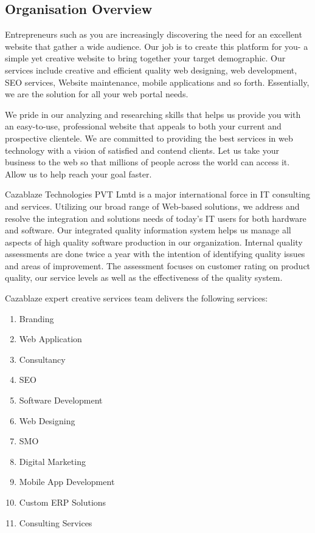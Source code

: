 \documentclass[a4paper,12pt]{article}
\begin{document}
\subsection{Organisation Overview}\vspace{5mm}
             Entrepreneurs such as you are increasingly discovering the need for an excellent website that gather a wide audience. Our job is to create this platform for you- a simple yet creative website to bring together your target demographic. Our services include creative and efficient quality web designing, web development, SEO services, Website maintenance, mobile applications and so forth. Essentially, we are the solution for all your web portal needs.
\newpage
\par  \vspace{2mm} 
            We pride in our analyzing and researching skills that helps us provide you with an easy-to-use, professional website that appeals to both your current and prospective clientele. We are committed to providing the best services in web technology with a vision of satisfied and contend clients. Let us take your business to the web so that millions of people across the world can access it. Allow us to help reach your goal faster.
\par  \vspace{2mm} 
Cazablaze Technologies PVT Lmtd is a major international force in IT consulting and services. Utilizing our broad range of Web-based solutions, we address and resolve the integration  and solutions needs of today's IT users for both hardware and software. Our integrated quality information system helps us manage all aspects of high quality software production in our organization. Internal quality assessments are done twice a year with the intention of identifying quality issues and areas of improvement. The assessment focuses on customer rating on product quality, our service levels as well as the effectiveness of the quality system.
\par  \vspace{2mm} 
Cazablaze expert creative services team delivers the following services:  
 \begin{enumerate}
\item Branding
\item Web Application
\item Consultancy
\item SEO
\item Software Development
\item Web Designing
\item SMO
\item Digital Marketing
\item Mobile App Development
\item Custom ERP Solutions
\item Consulting Services
\end{enumerate}          
\end{document}
